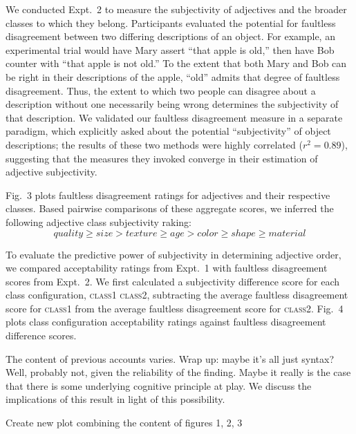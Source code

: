 \documentclass[12pt]{article}
\begin{document}
We conducted Expt.~2 to measure the subjectivity of adjectives and the broader classes to which they belong. Participants evaluated the potential for faultless disagreement between two differing descriptions of an object. For example, an experimental trial would have Mary assert ``that apple is old,'' then have Bob counter with ``that apple is not old.'' To the extent that both Mary and Bob can be right in their descriptions of the apple, ``old'' admits that degree of faultless disagreement. 
Thus, the extent to which two people can disagree about a description without one necessarily being wrong determines the subjectivity of that description. We validated our faultless disagreement measure in a separate paradigm, which explicitly asked about the potential ``subjectivity'' of object descriptions; the results of these two methods were highly correlated ($r^{2} = 0.89$), suggesting that the measures they invoked converge in their estimation of adjective subjectivity.

Fig.~3 plots faultless disagreement ratings for adjectives and their respective classes. Based pairwise comparisons of these aggregate scores, we inferred the following adjective class subjectivity raking:
$$ quality \geq size > texture \geq age > color \geq shape \geq material \label{inferred-subjectivity}$$

To evaluate the predictive power of subjectivity in determining adjective order, we compared acceptability ratings from Expt.~1 with faultless disagreement scores from Expt.\ 2. We first calculated a subjectivity difference score for each class configuration, \textsc{class1} \textsc{class2}, subtracting the average faultless disagreement score for \textsc{class1} from the average faultless disagreement score for \textsc{class2}. Fig.~4 plots class configuration acceptability ratings against faultless disagreement difference scores.

The content of previous accounts varies. Wrap up: maybe it's all just syntax? Well, probably not, given the reliability of the finding. Maybe it really is the case that there is some underlying cognitive principle at play. We discuss the implications of this result in light of this possibility.

Create new plot combining the content of figures 1, 2, 3
\end{document}
